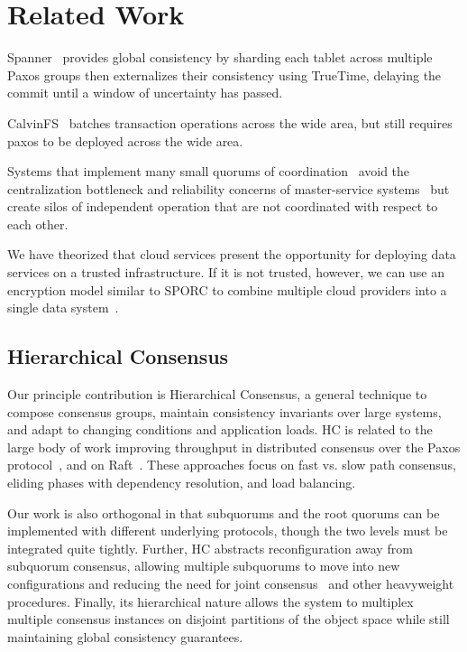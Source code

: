 
\renewcommand{\thechapter}{7}

\chapter{Related Work}
\label{ch:related_work}

Spanner~\cite{spanner} provides global consistency by sharding each tablet across multiple Paxos groups then externalizes their consistency using TrueTime, delaying the commit until a window of uncertainty has passed.

CalvinFS~\cite{calvindb,calvinfs} batches transaction operations across the wide area, but still requires paxos to be deployed across the wide area.

Systems that implement many small quorums of
coordination~\cite{mdcc,scatter,spanner} avoid the centralization bottleneck
and reliability concerns of master-service
systems~\cite{gray_dangers_1996,gfs} but create silos of independent
operation that are not coordinated with respect to each other.

We have theorized that cloud services present the opportunity for deploying data services on a trusted infrastructure. If it is not trusted, however, we can use an encryption model similar to SPORC to combine multiple cloud providers into a single data system~\cite{sporc}.

\section{Hierarchical Consensus}

Our principle contribution is Hierarchical Consensus, a general technique to compose consensus groups, maintain consistency invariants over large systems, and adapt to changing conditions and application loads.
HC is related to the large body of work improving throughput in distributed consensus over the Paxos protocol~\cite{paxos,epaxos,fexible_paxos,generalized_paxos}, and on Raft~\cite{raft,raft_refloated}.
These approaches focus on fast vs. slow path consensus, eliding phases with dependency resolution, and load balancing.

Our work is also orthogonal in that subquorums and the root quorums can be implemented with different underlying protocols, though the two levels must be integrated quite tightly.
Further, HC abstracts reconfiguration away from subquorum consensus, allowing multiple subquorums to move into new configurations and reducing the need for joint consensus~\cite{raft} and other heavyweight procedures.
Finally, its hierarchical nature allows the system to multiplex multiple consensus instances on disjoint partitions of the object space while still maintaining global consistency guarantees.

